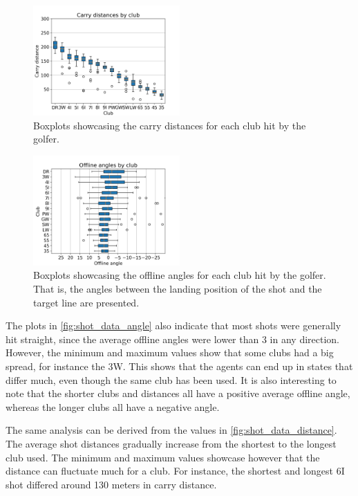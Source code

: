 \documentclass{kththesis}
\begin{document}
\begin{figure}
    \centering
    \includegraphics[width=0.5\textwidth]{Boxplots/distances.png}
    \caption{Boxplots showcasing the carry distances for each club hit by the golfer.}
    \label{fig:shot_data_distance}
\end{figure}

\begin{figure}
    \centering
    \includegraphics[width=0.5\textwidth]{Boxplots/directions.png}
    \caption{Boxplots showcasing the offline angles for each club hit by the golfer. That is, the angles between the landing position of the shot and the target line are presented.}
    \label{fig:shot_data_angle}
\end{figure}

The plots in \autoref{fig:shot_data_angle} also indicate that most shots were generally hit straight, since the average offline angles were lower than 3 in any direction. However, the minimum and maximum values show that some clubs had a big spread, for instance the 3W. This shows that the agents can end up in states that differ much, even though the same club has been used. It is also interesting to note that the shorter clubs and distances all have a positive average offline angle, whereas the longer clubs all have a negative angle.

The same analysis can be derived from the values in \autoref{fig:shot_data_distance}. The average shot distances gradually increase from the shortest to the longest club used. The minimum and maximum values showcase however that the distance can fluctuate much for a club. For instance, the shortest and longest 6I shot differed around 130 meters in carry distance. 
\end{document}
